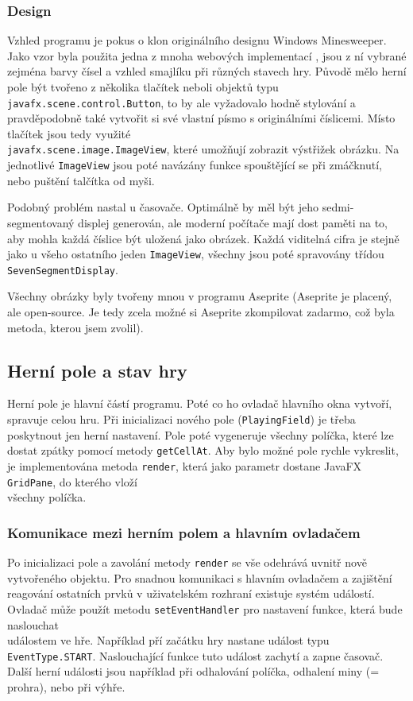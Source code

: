 \subsubsection{Design}
Vzhled programu je pokus o klon originálního designu Windows Minesweeper. Jako vzor byla použita jedna z mnoha
webových implementací \cite{playminesweeper}, jsou z ní vybrané zejména barvy čísel a vzhled smajlíku při
různých stavech hry. Původě mělo herní pole být tvořeno z několika tlačítek neboli objektů typu \\
{\tt javafx.scene.control.Button}, to by ale vyžadovalo hodně stylování a pravděpodobně také vytvořit si své
vlastní písmo s originálními číslicemi. Místo tlačítek jsou tedy využité \\{\tt javafx.scene.image.ImageView},
které umožňují zobrazit výstřižek obrázku. Na jednotlivé {\tt ImageView} jsou poté navázány funkce spouštějící
se při zmáčknutí, nebo puštění talčítka od myši.

Podobný problém nastal u časovače. Optimálně by měl být jeho sedmi-segmentovaný displej generován, ale moderní
počítače mají dost paměti na to, aby mohla každá číslice být uložená jako obrázek. Každá viditelná cifra je
stejně jako u všeho ostatního jeden {\tt ImageView}, všechny jsou poté spravovány třídou \\{\tt SevenSegmentDisplay}.

Všechny obrázky byly tvořeny mnou v programu Aseprite (Aseprite je placený, ale open-source. Je tedy zcela možné si
Aseprite zkompilovat zadarmo, což byla metoda, kterou jsem zvolil).

\subsection{Herní pole a stav hry}
Herní pole je hlavní částí programu. Poté co ho ovladač hlavního okna vytvoří, spravuje celou hru. Při inicializaci
nového pole ({\tt PlayingField}) je třeba poskytnout jen herní nastavení. Pole poté vygeneruje všechny políčka,
které lze dostat zpátky pomocí metody {\tt getCellAt}. Aby bylo možné pole rychle vykreslit,
je implementována metoda {\tt render}, která jako parametr dostane JavaFX {\tt GridPane}, do kterého
vloží \\všechny políčka.

\subsubsection{Komunikace mezi herním polem a hlavním ovladačem}
Po inicializaci pole a zavolání metody {\tt render} se vše odehrává uvnitř nově vytvořeného objektu.
Pro snadnou komunikaci s hlavním ovladačem a zajištění reagování ostatních prvků v uživatelském rozhraní existuje
systém událostí. Ovladač může použít metodu {\tt setEventHandler} pro nastavení funkce, která bude
naslouchat \\událostem ve hře. Například pří začátku hry nastane událost typu {\tt EventType.START}. 
Naslouchající funkce tuto událost zachytí a zapne časovač. Další herní události jsou například při odhalování políčka,
odhalení miny (= prohra), nebo při výhře.

